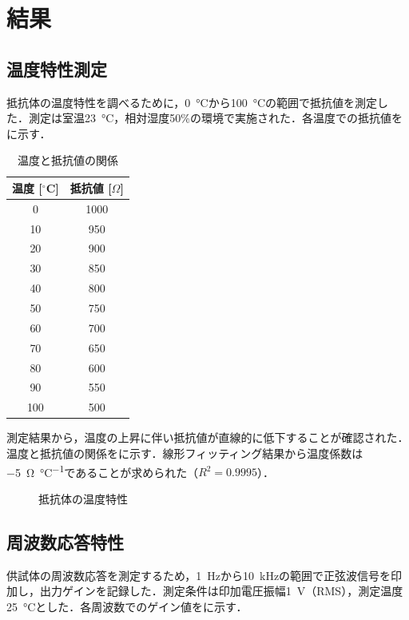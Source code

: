 \section{結果}

\subsection{温度特性測定}

抵抗体の温度特性を調べるために，\SI{0}{\celsius}から\SI{100}{\celsius}の範囲で抵抗値を測定した．測定は室温\SI{23}{\celsius}，相対湿度50\%の環境で実施された．各温度での抵抗値をに示す．

\begin{table}[H]
    \centering
    \caption{温度と抵抗値の関係}
    \label{tab:temperature}
    \begin{tabular}{cc}
        \hline
        温度 [$^\circ$C] & 抵抗値 [$\Omega$] \\
        \hline
        0 & 1000 \\
        10 & 950 \\
        20 & 900 \\
        30 & 850 \\
        40 & 800 \\
        50 & 750 \\
        60 & 700 \\
        70 & 650 \\
        80 & 600 \\
        90 & 550 \\
        100 & 500 \\
        \hline
    \end{tabular}
\end{table}

測定結果から，温度の上昇に伴い抵抗値が直線的に低下することが確認された．温度と抵抗値の関係をに示す．線形フィッティング結果から温度係数は\SI{-5}{\ohm\per\celsius}であることが求められた（$R^2 = 0.9995$）．

\begin{figure}[H]
    \centering
    \GraphTemperatureResponse
    \caption{抵抗体の温度特性}
    \label{fig:temperature}
\end{figure}

\subsection{周波数応答特性}

供試体の周波数応答を測定するため，\SI{1}{\hertz}から\SI{10}{\kilo\hertz}の範囲で正弦波信号を印加し，出力ゲインを記録した．測定条件は印加電圧振幅\SI{1}{\volt}（RMS），測定温度\SI{25}{\celsius}とした．各周波数でのゲイン値をに示す．

